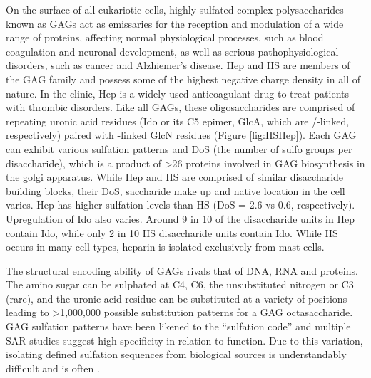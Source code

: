 \documentclass[journal=jctcce,manuscript=article]{achemso}
\begin{document}
{On the surface of all eukariotic cells, highly-sulfated complex polysaccharides known as \acp{GAG} act as emissaries for the reception and modulation of a wide range of proteins, affecting normal physiological processes, such as blood coagulation and neuronal development, as well as serious pathophysiological disorders, such as cancer and Alzhiemer's disease. 
\Ac{Hep} and \ac{HS} are members of the \ac{GAG} family and possess some of the highest negative charge density in all of nature. 
In the clinic, \ac{Hep} is a widely used anticoagulant drug to treat patients with thrombic disorders.\cite{Liu2014ChemoenzymaticHeparin.}
Like all \acp{GAG}, these oligosaccharides are comprised of repeating uronic acid residues (\ac{Ido} or its C5 epimer, \ac{GlcA}, which are \textalpha/-linked, respectively) paired with -linked \ac{GlcN} residues (Figure \ref{fig:HSHep}). 
Each \ac{GAG} can exhibit various sulfation patterns and \ac{DoS} (the number of sulfo groups per disaccharide), which is a product of \textgreater26 proteins involved in \ac{GAG} biosynthesis in the golgi apparatus.\cite{SoaresdaCosta2017SulfationDisorders, Varki2009BiologicalGlycans} 
While \ac{Hep} and \ac{HS} are comprised of similar disaccharide building blocks, their \ac{DoS}, saccharide make up and native location in the cell varies.
\ac{Hep} has higher sulfation levels than HS (\ac{DoS} = 2.6 vs 0.6, respectively). 
Upregulation of \ac{Ido} also varies. Around 9 in 10 of the disaccharide units in \ac{Hep} contain \ac{Ido}, while only 2 in 10 \ac{HS} disaccharide units contain \ac{Ido}. While \ac{HS} occurs in many cell types, heparin is isolated exclusively from mast cells.\cite{Liu2014ChemoenzymaticHeparin., Gandhi2008TheProteins}


The structural encoding ability of \acp{GAG} rivals that of DNA, RNA and proteins.\cite{Gama2006SulfationActivity} The amino sugar can be sulphated at C4, C6, the unsubstituted nitrogen or C3 (rare), and the uronic acid residue can be substituted at a variety of positions -- leading to \textgreater1,000,000 possible substitution patterns for a \ac{GAG} octasaccharide.\cite{Gandhi2008TheProteins, SoaresdaCosta2017SulfationDisorders,Gama2006SulfationActivity} GAG sulfation patterns have been likened to the “sulfation code” and multiple \ac{SAR} studies suggest high specificity in relation to function.\cite{Habuchi2004SulfationCode, Gama2006SulfationActivity} Due to this variation, isolating defined sulfation sequences from biological sources is understandably difficult and is often \cite{Gama2006SulfationActivity}. 

}
\end{document}
